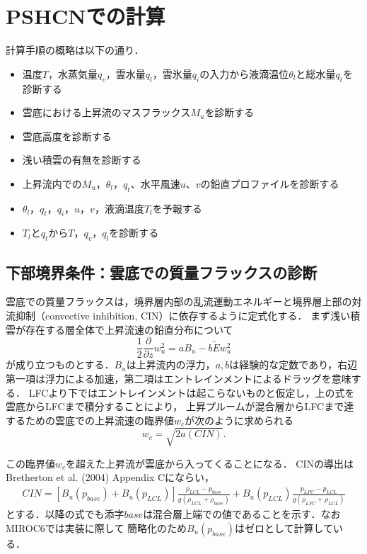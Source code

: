 \documentclass[platex, dvipdfmx]{jsarticle}
\begin{document}
\section{PSHCNでの計算}
計算手順の概略は以下の通り．

\begin{itemize}
    \item 温度$T$，水蒸気量$q_v$，雲水量$q_l$，雲氷量$q_i$の入力から液滴温位$\theta_l$と総水量$q_t$を診断する
    \item 雲底における上昇流のマスフラックス$M_u$を診断する
    \item 雲底高度を診断する
    \item 浅い積雲の有無を診断する
    \item 上昇流内での$M_u$，$\theta_l$，$q_t$、水平風速$u$、$v$の鉛直プロファイルを診断する
    \item $\theta_l$，$q_t$，$q_i$，$u$，$v$，液滴温度$T_l$を予報する
    \item $T_l$と$q_t$から$T$，$q_v$，$q_l$を診断する
\end{itemize}


\subsection{下部境界条件：雲底での質量フラックスの診断}
雲底での質量フラックスは，境界層内部の乱流運動エネルギーと境界層上部の対流抑制（convective inhibition, CIN）に依存するように定式化する．
まず浅い積雲が存在する層全体で上昇流速の鉛直分布について
\begin{equation}
    \frac{1}{2}\frac{\partial}{\partial z}w_u^2=aB_u-b\tilde{E} w_u^2
\end{equation}
が成り立つものとする．$B_u$は上昇流内の浮力，$a,b$は経験的な定数であり，右辺第一項は浮力による加速，第二項はエントレインメントによるドラッグを意味する．
LFCより下ではエントレインメントは起こらないものと仮定し，上の式を雲底からLFCまで積分することにより，
上昇プルームが混合層からLFCまで達するための雲底での上昇流速の臨界値$w_c$が次のように求められる
\begin{equation}
    w_c = \sqrt{2a(CIN)}.
\end{equation}

この臨界値$w_c$を超えた上昇流が雲底から入ってくることになる．
CINの導出はBretherton et al. (2004) Appendix Cにならい，
\begin{align}
    CIN = [B_u(p_{base}) + B_u(p_{LCL})]\frac{p_{LCL}-p_{base}}{g(\rho_{LCL}+\rho_{base})} + B_u(p_{LCL})\frac{p_{LFC}-p_{LCL}}{g(\rho_{LFC}+\rho_{LCL})}
\end{align}
とする．以降の式でも添字$\mathit{base}$は混合層上端での値であることを示す．なおMIROC6では実装に際して
簡略化のため$B_u(p_{base})$はゼロとして計算している．
\end{document}

